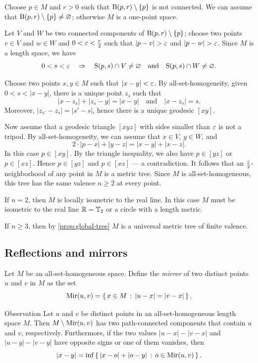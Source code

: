 \documentclass[a4paper,10pt]{article}
\begin{document}
Choose $p\in M$ and $r>0$ such that $\mathrm{B}(p,r)\setminus\{p\}$ is not connected.
We can assume that $\mathrm{B}(p,r)\setminus\{p\}\ne\varnothing$; otherwise $M$ is a one-point space.

Let $V$ and $W$ be two connected components of $\mathrm{B}(p,r)\setminus\{p\}$;
choose two points $v\in V$ and $w\in W$ and $0<\varepsilon<\tfrac r2$ such that $|p-v|>\eps$ and $|p-w|>\eps$.
Since $M$ is a length space, we have
\[
0<s<\varepsilon
\quad\Rightarrow\quad
\mathrm{S}(p,s)\cap V\ne\varnothing
\quad\text{and}\quad
\mathrm{S}(p,s)\cap W\ne\varnothing.
\]

Choose two points $x,y\in M$ such that $|x-y|<\varepsilon$.
By all-set-homogeneity, given $0<s<|x-y|$, there is a unique point $z_s$ such that
\[|x-z_s|+|z_s-y|=|x-y|
\quad\text{and}\quad
|x-z_s|=s.\]
Moreover, $|z_{s'}-z_s|=|s'-s|$, hence there is a unique geodesic $[xy]$.

Now assume that a geodesic triangle $[xyz]$ with sides smaller than $\varepsilon$ is not a tripod.
By all-set-homogeneity, we can assume that $x\in V$, $y\in W$, and
\[2\cdot |p-x|+|y-z|=|x-y|+|x-z|.\]
In this case $p\in [xy]$.
By the triangle inequality, we also have $p\in [yz]$ or $p\in [xz]$.
Hence $p\in [yz]$ and $p\in [xz]$ --- a contradiction.
It follows that an $\tfrac{\varepsilon}2$-neighborhood of any point in $M$ is a metric tree.
Since $M$ is all-set-homogeneous, this tree has the same valence $n\geqslant 2$ at every point.

If $n=2$, then $M$ is locally isometric to the real line.
In this case $M$ must be isometric to the real line $\mathbb{R}=\mathbb{T}_2$ or a circle with a length metric.

If $n\geqslant3$, then by \ref{prop:global-tree}  $M$ is a universal metric tree of finite valence.
\qeds

\subsection*{Reflections and mirrors}

Let $M$ be an all-set-homogeneous space.
Define the \emph{mirror} of two distinct points $u$ and $v$ in $M$ as the set
\[\mathrm{Mir}(u,v)=\left\{\,{x\in M}\,:\,{|u-x|=|v-x|}\,\right\}.\]

\begin{thm}{Observation}\label{lem:bisector}
Let $u$ and $v$ be distinct points in an all-set-homogeneous length space $M$.
Then $M\setminus \mathrm{Mir}(u,v)$ has two path-connected components that contain $u$ and $v$, respectively.
Furthermore, if the two values $|u-x|-|v-x|$ and $|u-y|-|v-y|$ have opposite signs or one of them vanishes, then
\[|x-y|=\inf\left\{\,{|x-o|+|o-y|}\,:\,{o\in \mathrm{Mir}(u,v)}\,\right\}.\]
\end{thm}
\end{document}
